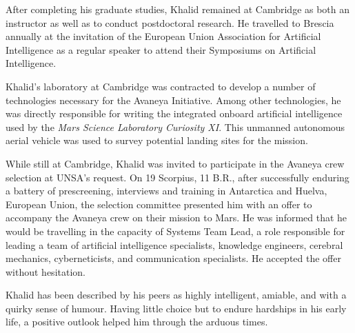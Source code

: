 After completing his graduate studies, Khalid remained at Cambridge as both an instructor as well as to conduct postdoctoral research. He travelled to Brescia annually at the invitation of the European Union Association for Artificial Intelligence as a regular speaker to attend their Symposiums on Artificial Intelligence.

Khalid's laboratory at Cambridge was contracted to develop a number of technologies necessary for the Avaneya Initiative. Among other technologies, he was directly responsible for writing the integrated onboard artificial intelligence used by the {\it Mars Science Laboratory Curiosity XI}. This unmanned autonomous aerial vehicle was used to survey potential landing sites for the mission.

While still at Cambridge, Khalid was invited to participate in the Avaneya crew selection at UNSA's request. On 19 Scorpius, 11 B.R., after successfully enduring a battery of prescreening, interviews and training in Antarctica and Huelva, European Union, the selection committee presented him with an offer to accompany the Avaneya crew on their mission to Mars. He was informed that he would be travelling in the capacity of Systems Team Lead, a role responsible for leading a team of artificial intelligence specialists, knowledge engineers, cerebral mechanics, cyberneticists, and communication specialists. He accepted the offer without hesitation.

Khalid has been described by his peers as highly intelligent, amiable, and with a quirky sense of humour. Having little choice but to endure hardships in his early life, a positive outlook helped him through the arduous times.

